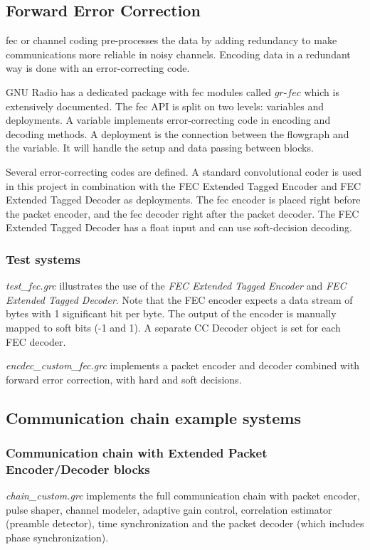 \subsection{Forward Error Correction}

\gls{fec} or channel coding pre-processes the data by adding redundancy to make communications more reliable in noisy channels. Encoding data in a redundant way is done with an error-correcting code.  \medskip

GNU Radio has a dedicated package with \gls{fec} modules called $gr$-$fec$ which is extensively documented. \cite{gr_fec_docs} %
The \gls{fec} API is split on two levels: variables and deployments. A variable implements error-correcting code in encoding and decoding methods. A deployment is the connection between the flowgraph and the variable. It will handle the setup and data passing between blocks. \medskip

Several error-correcting codes are defined. A standard convolutional coder is used in this project in combination with the FEC Extended Tagged Encoder and FEC Extended Tagged Decoder as deployments. The \gls{fec} encoder is placed right before the packet encoder, and the \gls{fec} decoder right after the packet decoder. The FEC Extended Tagged Decoder has a float input and can use soft-decision decoding. 



\subsubsection{Test systems}
\textit{test\_fec.grc} illustrates the use of the \textit{FEC Extended Tagged Encoder} and \textit{FEC Extended Tagged Decoder}. Note that the FEC encoder expects a data stream of bytes with 1 significant bit per byte. The output of the encoder is manually mapped to soft bits (-1 and 1). A separate CC Decoder object is set for each FEC decoder.\medskip

\textit{encdec\_custom\_fec.grc} implements a packet encoder and decoder combined with forward error correction,  with hard and soft decisions.



\subsection{Communication chain example systems}
\subsubsection*{Communication chain with Extended Packet Encoder/Decoder blocks}
\textit{chain\_custom.grc} implements the full communication chain with packet encoder, pulse shaper, channel modeler, adaptive gain control, correlation estimator (preamble detector), time synchronization and the packet decoder (which includes phase synchronization).

